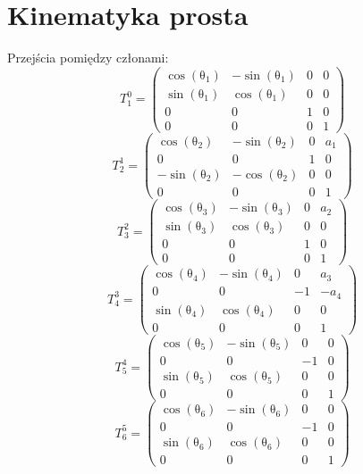 \documentclass[]{article}
\begin{document}
\section{Kinematyka prosta}
Przejścia pomiędzy członami:
\[T^0_1=\left(\begin{array}{cccc} \cos\!\left(\mathrm{\theta}_{1}\right) & - \sin\!\left(\mathrm{\theta}_{1}\right) & 0 & 0\\ \sin\!\left(\mathrm{\theta}_{1}\right) & \cos\!\left(\mathrm{\theta}_{1}\right) & 0 & 0\\ 0 & 0 & 1 & 0\\ 0 & 0 & 0 & 1 \end{array}\right)\]
\[
T^1_2=\left(\begin{array}{cccc} \cos\!\left(\mathrm{\theta}_{2}\right) & - \sin\!\left(\mathrm{\theta}_{2}\right) & 0 & a_{1}\\ 0 & 0 & 1 & 0\\ - \sin\!\left(\mathrm{\theta}_{2}\right) & - \cos\!\left(\mathrm{\theta}_{2}\right) & 0 & 0\\ 0 & 0 & 0 & 1 \end{array}\right)
\]
\[
T^2_3=\left(\begin{array}{cccc} \cos\!\left(\mathrm{\theta}_{3}\right) & - \sin\!\left(\mathrm{\theta}_{3}\right) & 0 & a_{2}\\ \sin\!\left(\mathrm{\theta}_{3}\right) & \cos\!\left(\mathrm{\theta}_{3}\right) & 0 & 0\\ 0 & 0 & 1 & 0\\ 0 & 0 & 0 & 1 \end{array}\right)
\]
\[
T^3_4=\left(\begin{array}{cccc} \cos\!\left(\mathrm{\theta}_{4}\right) & - \sin\!\left(\mathrm{\theta}_{4}\right) & 0 & a_{3}\\ 0 & 0 & -1 & - a_{4}\\ \sin\!\left(\mathrm{\theta}_{4}\right) & \cos\!\left(\mathrm{\theta}_{4}\right) & 0 & 0\\ 0 & 0 & 0 & 1 \end{array}\right)\]
\[
T^4_5=\left(\begin{array}{cccc} \cos\!\left(\mathrm{\theta}_{5}\right) & - \sin\!\left(\mathrm{\theta}_{5}\right) & 0 & 0\\ 0 & 0 & -1 & 0\\ \sin\!\left(\mathrm{\theta}_{5}\right) & \cos\!\left(\mathrm{\theta}_{5}\right) & 0 & 0\\ 0 & 0 & 0 & 1 \end{array}\right)\]
\[
T^5_6=\left(\begin{array}{cccc} \cos\!\left(\mathrm{\theta}_{6}\right) & - \sin\!\left(\mathrm{\theta}_{6}\right) & 0 & 0\\ 0 & 0 & -1 & 0\\ \sin\!\left(\mathrm{\theta}_{6}\right) & \cos\!\left(\mathrm{\theta}_{6}\right) & 0 & 0\\ 0 & 0 & 0 & 1 \end{array}\right)\]
\end{document}
